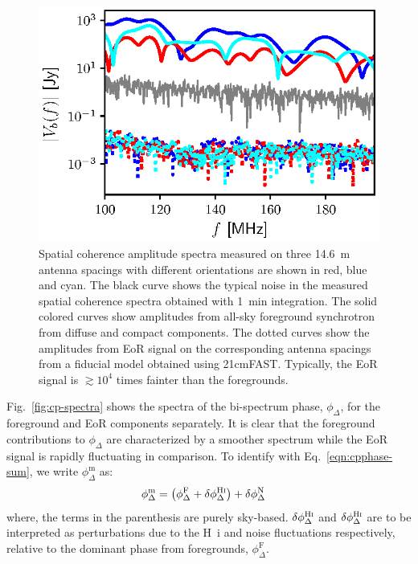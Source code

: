 \documentclass[
reprint,
superscriptaddress,
amsmath,
amssymb,
aps,
prd
]{revtex4-1}
\begin{document}
\begin{figure}[htb]
\includegraphics[width=\linewidth]{visamp_spectra_asm_eor_noise}
\caption{Spatial coherence amplitude spectra measured on three 14.6~m antenna spacings with different orientations are shown in red, blue and cyan. The black curve shows the typical noise in the measured spatial coherence spectra obtained with 1~min integration. The solid colored curves show amplitudes from all-sky foreground synchrotron from diffuse and compact components. The dotted curves show the amplitudes from EoR signal on the corresponding antenna spacings from a fiducial model obtained using 21cmFAST. Typically, the EoR signal is $\gtrsim 10^4$ times fainter than the foregrounds. \label{fig:vis-spectra}}
\end{figure}

Fig.~\ref{fig:cp-spectra} shows the spectra of the bi-spectrum phase, $\phi_\Delta$, for the foreground and EoR components separately. It is clear that the foreground contributions to $\phi_\Delta$ are characterized by a smoother spectrum while the EoR signal is rapidly fluctuating in comparison. To identify with Eq.~\ref{eqn:cpphase-sum}, we write $\phi_\Delta^\textrm{m}$ as:
\begin{align}\label{eqn:cp-components}
  \phi_\Delta^\textrm{m} &= \left(\phi_\Delta^\textrm{F} + \delta\phi_\Delta^\textrm{H{\sc i}}\right) + \delta\phi_\Delta^\textrm{N}
\end{align}
where, the terms in the parenthesis are purely sky-based. $\delta\phi_\Delta^\textrm{H{\sc i}}$ and $\delta\phi_\Delta^\textrm{H{\sc i}}$ are to be interpreted as perturbations due to the H~{\sc i} and noise fluctuations respectively, relative to the dominant phase from foregrounds, $\phi_\Delta^\textrm{F}$.
\end{document}
